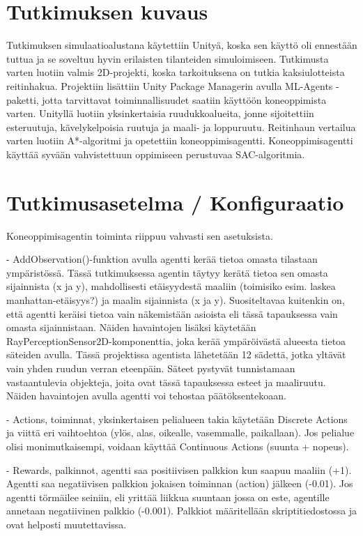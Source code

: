 \documentclass[utf8]{gradu3}
\begin{document}
\section{Tutkimuksen kuvaus}
\label{sec:tutkimuksenkuvaus}

Tutkimuksen simulaatioalustana käytettiin Unityä, koska sen käyttö oli ennestään tuttua ja se soveltuu hyvin erilaisten tilanteiden simuloimiseen. Tutkimusta varten luotiin valmis 2D-projekti, koska tarkoituksena on tutkia kaksiulotteista reitinhakua. Projektiin lisättiin Unity Package Managerin avulla ML-Agents -paketti, jotta tarvittavat toiminnallisuudet saatiin käyttöön koneoppimista varten. Unityllä luotiin yksinkertaisia ruudukkoalueita, jonne sijoitettiin esteruutuja, kävelykelpoisia ruutuja ja maali- ja loppuruutu. Reitinhaun vertailua varten luotiin A*-algoritmi ja opetettiin koneoppimisagentti. Koneoppimisagentti käyttää syvään vahvistettuun oppimiseen perustuvaa SAC-algoritmia.

\section{Tutkimusasetelma / Konfiguraatio}
\label{sec:tutkimusasetelma}

Koneoppimisagentin toiminta riippuu vahvasti sen asetuksista.

- AddObservation()-funktion avulla agentti kerää tietoa omasta tilastaan ympäristössä. Tässä tutkimuksessa agentin täytyy kerätä tietoa sen omasta sijainnista (x ja y), mahdollisesti etäisyydestä maaliin (toimisiko esim. laskea manhattan-etäisyys?) ja maalin sijainnista (x ja y). Suositeltavaa kuitenkin on, että agentti keräisi tietoa vain näkemistään asioista eli tässä tapauksessa vain omasta sijainnistaan. Näiden havaintojen lisäksi käytetään RayPerceptionSensor2D-komponenttia, joka kerää ympäröivästä alueesta tietoa säteiden avulla. Tässä projektissa agentista lähetetään 12 sädettä, jotka yltävät vain yhden ruudun verran eteenpäin. Säteet pystyvät tunnistamaan vastaantulevia objekteja, joita ovat tässä tapauksessa esteet ja maaliruutu. Näiden havaintojen avulla agentti voi tehostaa päätöksentekoaan.

- Actions, toiminnat, yksinkertaisen pelialueen takia käytetään Discrete Actions ja viittä eri vaihtoehtoa (ylös, alas, oikealle, vasemmalle, paikallaan). Jos pelialue olisi monimutkaisempi, voidaan käyttää Continuous Actions (suunta + nopeus).

- Rewards, palkinnot, agentti saa positiivisen palkkion kun saapuu maaliin (+1). Agentti saa negatiivisen palkkion jokaisen toiminnan (action) jälkeen (-0.01). Jos agentti törmäilee seiniin, eli yrittää liikkua suuntaan jossa on este, agentille annetaan negatiivinen palkkio (-0.001). Palkkiot määritellään skriptitiedostossa ja ovat helposti muutettavissa.
\end{document}
